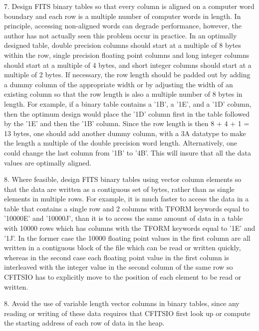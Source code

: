 7. Design FITS binary tables so that every column is aligned on a
computer word boundary and each row is a multiple number of computer
words in length.  In principle, accessing non-aligned words can degrade
performance, however, the author has not actually seen this problem
occur in practice.  In an optimally designed table,  double precision
columns should start at a multiple of 8 bytes within the row, single
precision floating point columns and long integer columns should start
at a multiple of 4 bytes, and short integer columns should start at a
multiple of 2 bytes.  If necessary, the row length should be padded out
by adding a dummy column of the appropriate width or by adjusting the
width of an existing column so that the row length is also a multiple
number of 8 bytes in length.  For example, if a binary table contains a
'1B', a '1E', and a '1D' column, then the optimum design would place
the '1D' column first in the table followed by the '1E' and then the
'1B' column.  Since the row length is then 8 + 4 + 1 = 13 bytes, one
should add another dummy column, with a 3A datatype to make the length
a multiple of the double precision word length.  Alternatively, one
could change the last column from '1B' to '4B'. This will insure that
all the data values are optimally aligned.

8. Where feasible, design FITS binary tables using vector column
elements so that the data are written as a contiguous set of bytes,
rather than as single elements in multiple rows.  For example, it is
much faster to access the data in a table that contains a single row
and 2 columns with TFORM keywords equal to  '10000E' and '10000J', than
it is to access the same amount of data in a table with 10000 rows
which has columns with the TFORM keywords equal to '1E' and '1J'.  In
the former case the 10000 floating point values in the first column are
all written in a contiguous block of the file which can be read or
written quickly, whereas in the second case each floating point value
in the first column is interleaved with the integer value in the second
column of the same row so CFITSIO has to explicitly move to the
position of each element to be read or written.

8. Avoid the use of variable length vector columns in binary tables,
since any reading or writing of these data requires that CFITSIO first
look up or compute the starting address of each row of data in the
heap.

